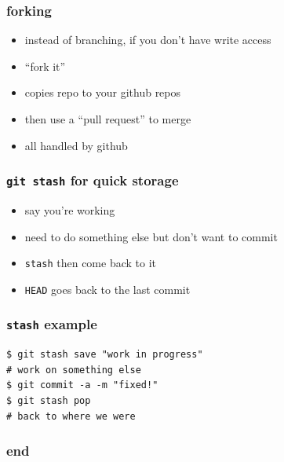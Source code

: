\documentclass[ignorenonframetext,]{beamer}
\begin{document}
\begin{frame}\frametitle{forking}

\begin{itemize}[<+->]
\item
  instead of branching, if you don't have write access
\item
  ``fork it''
\item
  copies repo to your github repos
\item
  then use a ``pull request'' to merge
\item
  all handled by github
\end{itemize}

\end{frame}

\begin{frame}[fragile]\frametitle{\texttt{git stash} for quick storage}

\begin{itemize}[<+->]
\item
  say you're working
\item
  need to do something else but don't want to commit
\item
  \texttt{stash} then come back to it
\item
  \texttt{HEAD} goes back to the last commit
\end{itemize}

\end{frame}

\begin{frame}[fragile]\frametitle{\texttt{stash} example}

\begin{verbatim}
$ git stash save "work in progress"
# work on something else
$ git commit -a -m "fixed!"
$ git stash pop
# back to where we were
\end{verbatim}

\end{frame}

\begin{frame}\frametitle{end}

\end{frame}
\end{document}
